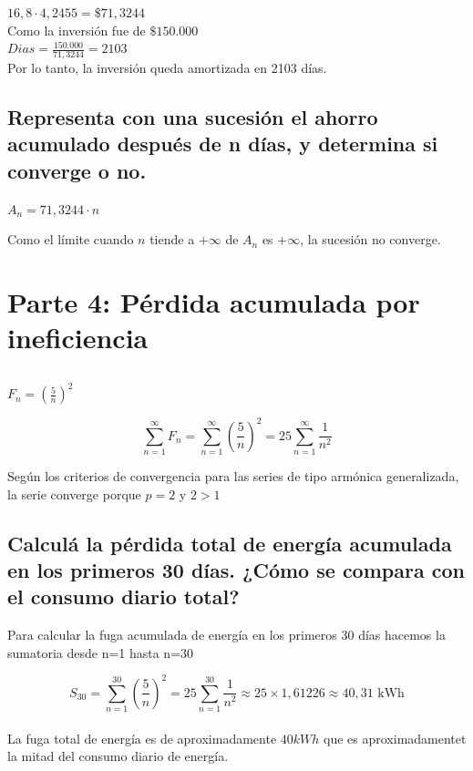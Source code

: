 \documentclass[11pt, a4paper]{article}
\begin{document}
$16,8 \cdot 4,2455 = \$71,3244$ \\

Como la inversión fue de $\$150.000$ \\

$Dias = \frac{150.000}{71,3244} = 2103$ \\

Por lo tanto, la inversión queda amortizada en 2103 días.

\subsection{Representa con una sucesión el ahorro acumulado después de n días, y determina si converge o no.}

$A_n = 71,3244 \cdot n$

Como el límite cuando $n$ tiende a $+\infty$ de $A_n$ es $+\infty$, la sucesión no converge.

\section{Parte 4: Pérdida acumulada por ineficiencia}

\subsection{}
$F_n = (\frac{5}{n})^2$

\[ \sum_{n=1}^{\infty}F_{n} = \sum_{n=1}^{\infty}\left(\frac{5}{n}\right)^{2} = 25 \sum_{n=1}^{\infty}\frac{1}{n^{2}} \]

Según los criterios de convergencia para las series de tipo armónica generalizada, la serie converge porque $p=2$ y $2 > 1$

\subsection{ Calculá la pérdida total de energía acumulada en los primeros 30 días. ¿Cómo se compara con el consumo diario total?}

Para calcular la fuga acumulada de energía en los primeros 30 días hacemos la sumatoria desde n=1 hasta n=30

\[ S_{30} = \sum_{n=1}^{30}\left(\frac{5}{n}\right)^{2} = 25 \sum_{n=1}^{30}\frac{1}{n^{2}} \approx 25 \times 1,61226 \approx 40,31 \text{ kWh} \] \\

La fuga total de energía es de aproximadamente $40kWh$ que es aproximadamentet la mitad del consumo diario de energía.
\end{document}
